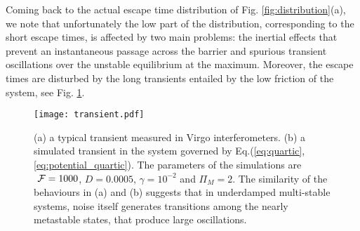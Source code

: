\documentclass[conference]{IEEEtran}
\begin{document}
Coming back to the actual escape time distribution of Fig. \ref{fig:distribution}(a), we note that unfortunately the low part of the distribution, corresponding to the short escape times, is affected by two main problems: the inertial effects that prevent an instantaneous passage across the barrier and spurious transient oscillations over the unstable equilibrium at the maximum. Moreover, the escape times are disturbed by the long transients \cite{Rampone13} entailed by the low friction of the system, see Fig. \ref{fig:transient}. 


\begin{figure}
\centerline{\texttt{[image: transient.pdf]}}
\caption{
(a) a typical transient measured in Virgo interferometers.
(b) a simulated transient in the system governed by Eq.(\ref{eq:quartic},\ref{eq:potential_quartic}). 
The parameters of the simulations are $~{\cal F}=1000$, $D = 0.0005$, $\gamma = 10^{-2}$ and $\Pi_M=2$.
The similarity of the  behaviours in (a) and (b) suggests that in underdamped multi-stable systems, noise itself generates transitions among the nearly metastable states, that produce large oscillations.
}
\label{fig:transient}
\end{figure}
\end{document}

